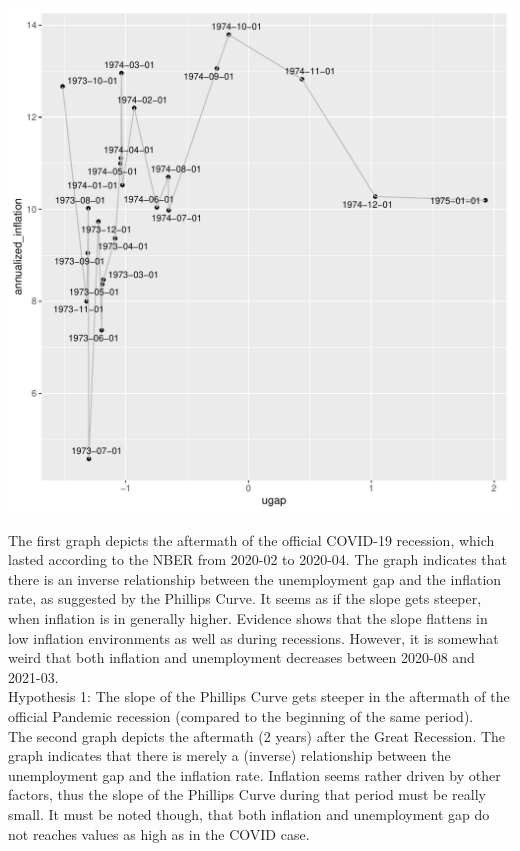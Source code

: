 \documentclass{article}\usepackage[]{graphicx}\usepackage[]{color}
\makeatletter
\def\maxwidth{ %
  \ifdim\Gin@nat@width>\linewidth
    \linewidth
  \else
    \Gin@nat@width
  \fi
}
\newenvironment{knitrout}{}{} %
\makeatother
\begin{document}
\begin{knitrout}
\includegraphics[width=\maxwidth]{figure/unnamed-chunk-1-3} 

\end{knitrout}

The first graph depicts the aftermath of the official COVID-19 recession, which lasted according to the NBER from 2020-02 to 2020-04. The graph indicates that there is an inverse relationship between the unemployment gap and the inflation rate, as suggested by the Phillips Curve. It seems as if the slope gets steeper, when inflation is in generally higher. Evidence shows that the slope flattens in low inflation environments as well as during recessions. However, it is somewhat weird that both inflation and unemployment decreases between 2020-08 and 2021-03. \\

Hypothesis 1: The slope of the Phillips Curve gets steeper in the aftermath of the official Pandemic recession (compared to the beginning of the same period).  \\

The second graph depicts the aftermath (2 years) after the Great Recession. The graph indicates that there is merely a (inverse) relationship between the unemployment gap and the inflation rate. Inflation seems rather driven by other factors, thus the slope of the Phillips Curve during that period must be really small. It must be noted though, that both inflation and unemployment gap do not reaches values as high as in the COVID case. \\
\end{document}

